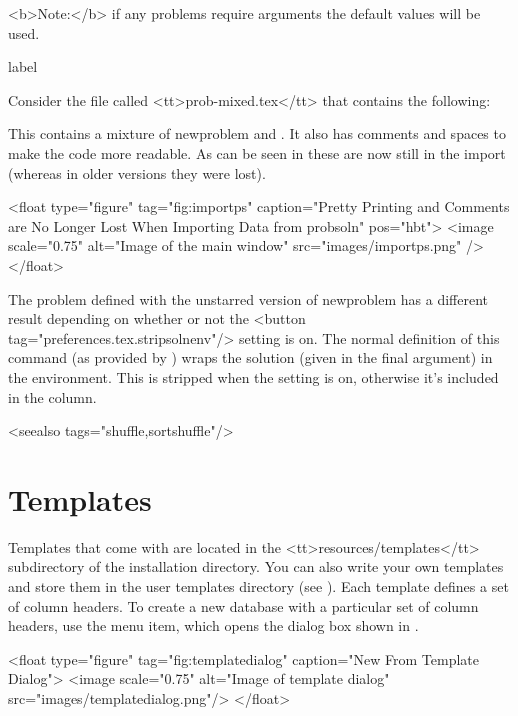    <b>Note:</b> if any problems require arguments the default values 
   will be used.

\begin{example}{label}{}

   Consider the file called <tt>prob-mixed.tex</tt> that contains the 
   following:



   This contains a mixture of \gls{newproblem} and
   . It also has comments and spaces to make
   the code more readable. As can be seen in 
   these are now still in the import (whereas in older versions they were lost).

     <float type="figure" tag="fig:importps" caption="Pretty Printing and Comments are No Longer Lost When Importing Data from probsoln" pos="hbt">
      <image scale="0.75" alt="Image of the main window" src="images/importps.png" />
     </float>
\end{example}

   The problem defined with the unstarred version of \gls{newproblem}
   has a different result depending on whether or not the 
   <button tag="preferences.tex.stripsolnenv"/> setting is on. The 
   normal definition of this command (as provided by )
   wraps the solution (given in the final argument) in the 
    environment. This is stripped when the setting is
   on, otherwise it's included in the  column.

   <seealso tags="shuffle,sortshuffle"/>

\chapter{Templates}\label{sec:templates}

   Templates that come with  are located in the <tt>resources/templates</tt>
   subdirectory of the  installation directory. You can also write
   your own templates and store them in the user templates directory 
   (see ). Each template defines a set
   of column headers. To create a new database with a particular
   set of column headers, use the 
   menu item, which opens the dialog box shown in .

   <float type="figure" tag="fig:templatedialog" 
      caption="New From Template Dialog">
     <image scale="0.75" alt="Image of template dialog"
        src="images/templatedialog.png"/>
   </float>

